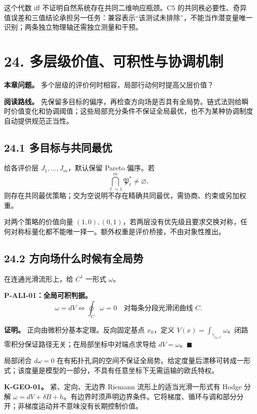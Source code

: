 \documentclass[
  11pt,
  oneside]{book}
\begin{document}
这个代数 iff 不证明自然系统存在共同二维响应瓶颈。C5 的共同秩必要性、奇异值误差和三值结论承担另一任务：兼容表示``该测试未排除''，不能当作潜变量唯一识别；两条独立物理轴还需独立测量和干预。

\chapter{24. 多层级价值、可积性与协调机制}\label{ch-24}

\textbf{本章问题。} 多个层级的评价何时相容，局部行动何时提高父层价值？

\textbf{阅读路线。} 先保留多目标的偏序，再检查方向场是否具有全局势。链式法则给瞬时价值变化和协调阈值；这些局部充分条件不保证全局最优，也不为某种协调制度自动提供规范正当性。

\section{24.1 多目标与共同最优}\label{ux591aux76eeux6807ux4e0eux5171ux540cux6700ux4f18}

给各评价层 \(J_1,\ldots,J_m\)，默认保留 Pareto 偏序。若 \[\bigcap_{\ell=1}^m\mathfrak P_\ell^*\ne\varnothing,\] 则存在共同最优策略；交为空说明不存在精确共同最优，需协商、约束或另加权重。

对两个策略的价值向量 \((1,0),(0,1)\)，若两层没有优先级且要求交换对称，任何对称标量化都不能唯一择一。额外权重是评价桥接，不由对象性推出。

\section{24.2 方向场什么时候有全局势}\label{ux65b9ux5411ux573aux4ec0ux4e48ux65f6ux5019ux6709ux5168ux5c40ux52bf}

在连通光滑流形上，给 \(C^1\) 一形式 \(\omega\)。

\hypertarget{p-ali-01}{}\label{p-ali-01}

\textbf{P-ALI-01：全局可积判据。} \[\omega=dV
\iff
\oint_C\omega=0
\quad\text{对每条分段光滑闭曲线 }C.\]

\textbf{证明。} 正向由微积分基本定理。反向固定基点 \(x_0\)，定义 \(V(x)=\int_{\gamma_{x_0,x}}\omega\)。闭路零积分保证路径无关；在局部坐标中对端点求导给 \(dV=\omega\)。\(\blacksquare\)

局部闭合 \(d\omega=0\) 在有拓扑孔洞的空间不保证全局势。给定度量后漂移可转成一形式；该度量是模型的一部分，不具有任意坐标下无需运输的欧氏特权。

\textbf{K-GEO-01。} 紧、定向、无边界 Riemann 流形上的适当光滑一形式有 Hodge 分解 \(\omega=dV+\delta B+h\)。有边界时须声明边界条件。它将梯度、循环与调和部分分开；非梯度运动并不意味没有长期控制价值。
\end{document}
